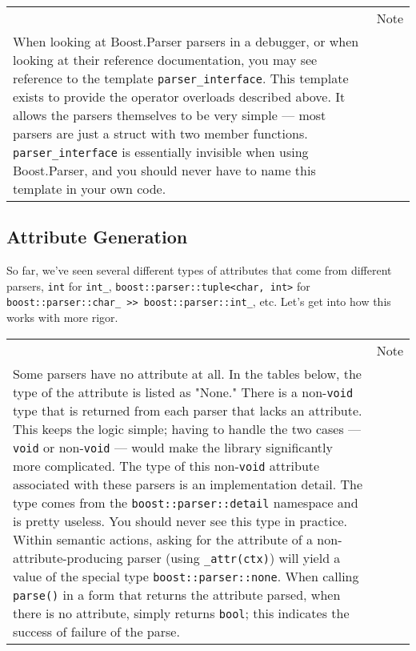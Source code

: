 \begin{longtable}[]{@{}
  >{\raggedright\arraybackslash}p{}
  >{\raggedright\arraybackslash}p{}@{}}
\toprule\noalign{}
\endhead
\bottomrule\noalign{}
\endlastfoot
\begin{minipage}[t]{\linewidth}\raggedright
\end{minipage} & Note \\
When looking at Boost.Parser parsers in a debugger, or when looking at their reference documentation, you may see reference to the template \texttt{parser\_interface}. This template exists to provide the operator overloads described above. It allows the parsers themselves to be very simple --- most parsers are just a struct with two member functions. \texttt{parser\_interface} is essentially invisible when using Boost.Parser, and you should never have to name this template in your own code. & \\
\end{longtable}

\subsection{Attribute Generation}

So far, we've seen several different types of attributes that come from different parsers, \texttt{int} for \texttt{int\_}, \texttt{boost::parser::tuple<char, int>} for \texttt{boost::parser::char\_ >> boost::parser::int\_}, etc. Let's get into how this works with more rigor.

\begin{longtable}[]{@{}
  >{\raggedright\arraybackslash}p{}
  >{\raggedright\arraybackslash}p{}@{}}
\toprule\noalign{}
\endhead
\bottomrule\noalign{}
\endlastfoot
\begin{minipage}[t]{\linewidth}\raggedright
\end{minipage} & Note \\
Some parsers have no attribute at all. In the tables below, the type of the attribute is listed as "None." There is a non-\texttt{void} type that is returned from each parser that lacks an attribute. This keeps the logic simple; having to handle the two cases --- \texttt{void} or non-\texttt{void} --- would make the library significantly more complicated. The type of this non-\texttt{void} attribute associated with these parsers is an implementation detail. The type comes from the \texttt{boost::parser::detail} namespace and is pretty useless. You should never see this type in practice. Within semantic actions, asking for the attribute of a non-attribute-producing parser (using \texttt{\_attr(ctx)}) will yield a value of the special type \texttt{boost::parser::none}. When calling \texttt{parse()} in a form that returns the attribute parsed, when there is no attribute, simply returns \texttt{bool}; this indicates the success of failure of the parse. & \\
\end{longtable}

